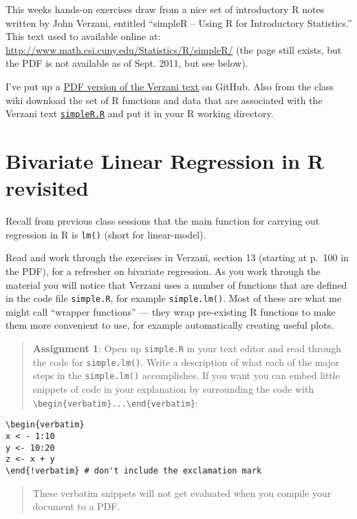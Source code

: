 



This weeks hands-on exercises draw from a nice set of introductory R
notes written by John Verzani, entitled ``simpleR -- Using R for
Introductory Statistics.'' This text used to available online at:
\url{http://www.math.csi.cuny.edu/Statistics/R/simpleR/} (the page still
exists, but the PDF is not available as of Sept. 2011, but see below).

I've put up a
\href{https://raw.github.com/pmagwene/Bio313/master/lecture-04/simpleR.pdf}{PDF
version of the Verzani text} on GitHub. Also from the class wiki
download the set of R functions and data that are associated with the
Verzani text
\href{https://raw.github.com/pmagwene/Bio313/master/lecture-04/simpleR.R}{\lstinline!simpleR.R!}
and put it in your R working directory.

\section{Bivariate Linear Regression in R revisited}

Recall from previous class sessions that the main function for carrying
out regression in R is \lstinline!lm()! (short for linear-model).

Read and work through the exercises in Verzani, section 13 (starting at
p.~100 in the PDF), for a refresher on bivariate regression. As you work
through the material you will notice that Verzani uses a number of
functions that are defined in the code file \lstinline!simple.R!, for
example \lstinline!simple.lm()!. Most of these are what me might call
``wrapper functions'' --- they wrap pre-existing R functions to make
them more convenient to use, for example automatically creating useful
plots.

\begin{quote}
\textbf{Assignment 1}: Open up \lstinline!simple.R! in your text editor
and read through the code for \lstinline!simple.lm()!. Write a
description of what each of the major steps in the
\lstinline!simple.lm()! accomplishes. If you want you can embed little
snippets of code in your explanation by surrounding the code with
\lstinline!\begin{verbatim}...\end{verbatim}!:

\end{quote}
\begin{lstlisting}
\begin{verbatim}
x < - 1:10
y <- 10:20
z <- x + y
\end{!verbatim} # don't include the exclamation mark
\end{lstlisting}
\begin{quote}
These verbatim snippets will not get evaluated when you compile your
document to a PDF.

\end{quote}
